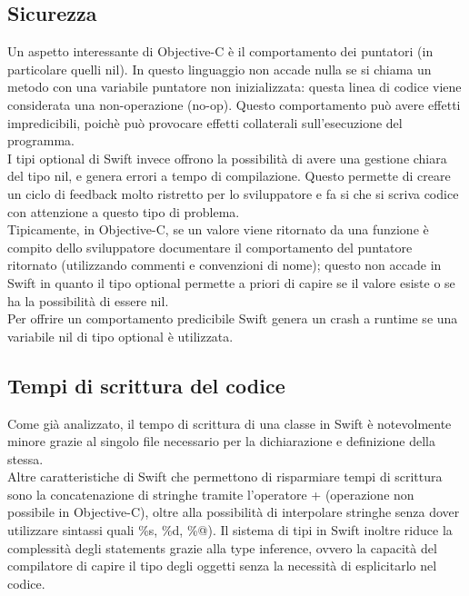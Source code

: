 \subsection{Sicurezza} 
Un aspetto interessante di Objective-C è il comportamento dei puntatori (in particolare quelli nil). In questo linguaggio non accade nulla se si chiama un metodo con una variabile puntatore non inizializzata: questa linea di codice viene considerata una non-operazione (no-op). Questo comportamento può avere effetti impredicibili, poichè può provocare effetti collaterali sull'esecuzione del programma.\\
I tipi optional di Swift invece offrono la possibilità di avere una gestione chiara del tipo nil, e genera errori a tempo di compilazione. Questo permette di creare un ciclo di feedback molto ristretto per lo sviluppatore e fa si che si scriva codice con attenzione a questo tipo di problema.\\
Tipicamente, in Objective-C, se un valore viene ritornato da una funzione è compito dello sviluppatore documentare il comportamento del puntatore ritornato (utilizzando commenti e convenzioni di nome); questo non accade in Swift in quanto il tipo optional permette a priori di capire se il valore esiste o se ha la possibilità di essere nil.\\ Per offrire un comportamento predicibile Swift genera un crash a runtime se una variabile nil di tipo optional è utilizzata.\\
\subsection{Tempi di scrittura del codice}
Come già analizzato, il tempo di scrittura di una classe in Swift è notevolmente minore grazie al singolo file necessario per la dichiarazione e definizione della stessa.\\Altre caratteristiche di Swift che permettono di risparmiare tempi di scrittura sono la concatenazione di stringhe tramite l'operatore + (operazione non possibile in Objective-C), oltre alla possibilità di interpolare stringhe senza dover utilizzare sintassi quali \%s, \%d, \%@). Il sistema di tipi in Swift inoltre riduce la complessità degli statements grazie alla type inference, ovvero la capacità del compilatore di capire il tipo degli oggetti senza la necessità di esplicitarlo nel codice.
